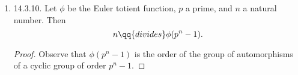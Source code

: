 \documentclass[onesided]{ccg-pset}
\begin{document}
\begin{enumerate}
\item \label{14.3.10} 14.3.10.
Let $\phi$ be the Euler totient function, $p$ a prime, and $n$ a natural number. Then
\[
    n \qq{divides} \phi(p^n -1)
.\]
\begin{proof}
    Observe that $\phi(p^n -1)$ is the order of the group of automorphisms of a cyclic group of order $p^n -1$.
\end{proof}

\end{enumerate}
\end{document}
